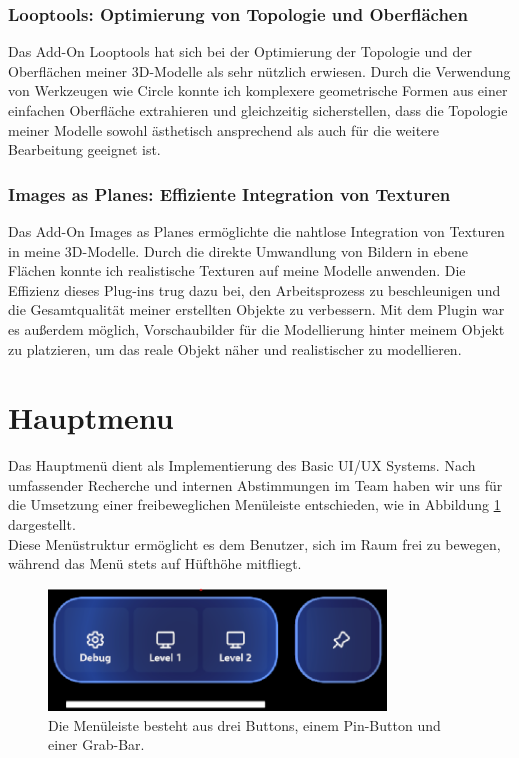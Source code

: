 \subsubsection{Looptools: Optimierung von Topologie und Oberflächen}

Das Add-On Looptools hat sich bei der Optimierung der Topologie und der Oberflächen meiner 3D-Modelle als sehr nützlich
erwiesen. Durch die Verwendung von Werkzeugen wie Circle konnte ich komplexere geometrische Formen aus einer einfachen Oberfläche
extrahieren und gleichzeitig sicherstellen, dass die Topologie meiner Modelle sowohl ästhetisch ansprechend als auch für die weitere
Bearbeitung geeignet ist.

\subsubsection{Images as Planes: Effiziente Integration von Texturen}

Das Add-On Images as Planes ermöglichte die nahtlose Integration von Texturen in meine 3D-Modelle. Durch die direkte
Umwandlung von Bildern in ebene Flächen konnte ich realistische Texturen auf meine Modelle anwenden. Die Effizienz dieses
Plug-ins trug dazu bei, den Arbeitsprozess zu beschleunigen und die Gesamtqualität meiner erstellten Objekte zu verbessern.
Mit dem Plugin war es außerdem möglich, Vorschaubilder für die Modellierung hinter meinem Objekt zu platzieren, um das
reale Objekt näher und realistischer zu modellieren.

\section{Hauptmenu}
Das Hauptmenü dient als Implementierung des Basic UI/UX Systems. Nach umfassender Recherche und internen
Abstimmungen im Team haben wir uns für die Umsetzung einer freibeweglichen Menüleiste entschieden, wie in
Abbildung \ref{fig:menübar} dargestellt.
\\
Diese Menüstruktur ermöglicht es dem Benutzer, sich im Raum frei zu bewegen, während das Menü stets
auf Hüfthöhe mitfliegt.

\begin{figure}[h]
    \centering
    \includegraphics[width=0.8\textwidth]{images/menubar.png}
    \caption{Die Menüleiste besteht aus drei Buttons, einem Pin-Button und einer Grab-Bar.}
    \label{fig:menübar}
\end{figure}

